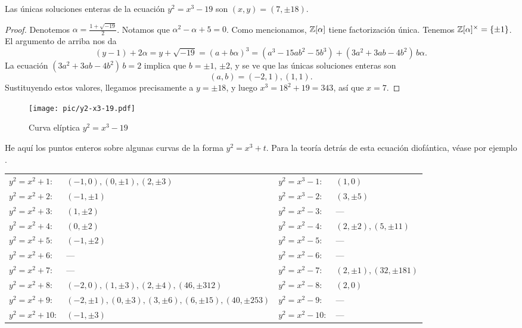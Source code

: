 \begin{proposicion}
  Las únicas soluciones enteras de la ecuación $y^2 = x^3 - 19$ son
  $(x,y) = (7, \pm 18)$.

  \begin{proof}
    Denotemos $\alpha = \frac{1+\sqrt{-19}}{2}$. Notamos que
    $\alpha^2 - \alpha + 5 = 0$. Como mencionamos, $\mathbb{Z} [\alpha]$ tiene
    factorización única. Tenemos $\mathbb{Z} [\alpha]^\times = \{ \pm 1 \}$.
    El argumento de arriba nos da
    \[ (y-1) + 2\alpha = y + \sqrt{-19} = \left(a + b\alpha\right)^3
           = (a^3 - 15ab^2 - 5b^3) + (3a^2 + 3ab - 4b^2)\,b \alpha. \]
    La ecuación $(3a^2 + 3ab - 4b^2)\,b = 2$ implica que $b = \pm 1$, $\pm 2$,
    y se ve que las únicas soluciones enteras son
    $$(a,b) = (-2,1), (1,1).$$
    Sustituyendo estos valores, llegamos precisamente a $y = \pm 18$, y luego
    $x^3 = 18^2 + 19 = 343$, así que $x = 7$.
  \end{proof}
\end{proposicion}

\begin{figure}
  \begin{center}
    \texttt{[image: pic/y2-x3-19.pdf]}
  \end{center}

  \caption{Curva elíptica $y^2 = x^3 - 19$}
  \label{fig:y2-x3-19}
\end{figure}

\begin{ejemplo}
  He aquí los puntos enteros sobre algunas curvas de la forma $y^2 = x^3 + t$.
  Para la teoría detrás de esta ecuación diofántica, véase por ejemplo
  \cite{Cohen-GTM239}.

  \begin{center}
    \begin{tabular}{ll|ll}
      $y^2 = x^2 + 1\colon$ & $(-1,0), (0,\pm 1), (2,\pm 3)$ & $y^2 = x^3 - 1\colon$ & $(1,0)$ \\
      $y^2 = x^2 + 2\colon$ & $(-1,\pm 1)$ & $y^2 = x^3 - 2\colon$ & $(3,\pm 5)$ \\
      $y^2 = x^2 + 3\colon$ & $(1,\pm 2)$ & $y^2 = x^2 - 3\colon$ & --- \\
      $y^2 = x^2 + 4\colon$ & $(0,\pm 2)$ & $y^2 = x^2 - 4\colon$ & $(2,\pm 2), (5,\pm 11)$ \\
      $y^2 = x^2 + 5\colon$ & $(-1,\pm 2)$ & $y^2 = x^2 - 5\colon$ & --- \\
      $y^2 = x^2 + 6\colon$ & --- & $y^2 = x^2 - 6\colon$ & --- \\
      $y^2 = x^2 + 7\colon$ & --- & $y^2 = x^2 - 7\colon$ & $(2,\pm 1), (32,\pm 181)$ \\
      $y^2 = x^2 + 8\colon$ & $(-2,0), (1,\pm 3), (2,\pm 4), (46,\pm 312)$ & $y^2 = x^2 - 8\colon$ & $(2,0)$ \\
      $y^2 = x^2 + 9\colon$ & $(-2,\pm 1), (0,\pm 3), (3,\pm 6), (6,\pm 15), (40,\pm 253)$ & $y^2 = x^2 - 9\colon$ & --- \\
      $y^2 = x^2 + 10\colon$ & $(-1,\pm 3)$ & $y^2 = x^2 - 10\colon$ & --- \\
    \end{tabular}
  \end{center}
\end{ejemplo}

